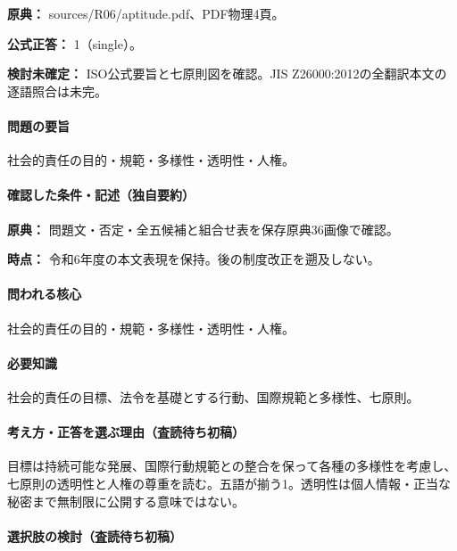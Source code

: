 \noindent\textbf{原典：} sources/R06/aptitude.pdf、PDF物理4頁。

\textbf{公式正答：} 1（single）。

\par\textbf{検討未確定：} ISO公式要旨と七原則図を確認。JIS Z26000:2012の全翻訳本文の逐語照合は未完。

\paragraph{問題の要旨} 社会的責任の目的・規範・多様性・透明性・人権。

\paragraph{確認した条件・記述（独自要約）}\mbox{}\par

\noindent\textbf{原典：} 問題文・否定・全五候補と組合せ表を保存原典36画像で確認。\par

\noindent\textbf{時点：} 令和6年度の本文表現を保持。後の制度改正を遡及しない。\par

\paragraph{問われる核心} 社会的責任の目的・規範・多様性・透明性・人権。

\paragraph{必要知識} 社会的責任の目標、法令を基礎とする行動、国際規範と多様性、七原則。

\paragraph{考え方・正答を選ぶ理由（査読待ち初稿）} 目標は持続可能な発展、国際行動規範との整合を保って各種の多様性を考慮し、七原則の透明性と人権の尊重を読む。五語が揃う1。透明性は個人情報・正当な秘密まで無制限に公開する意味ではない。

\paragraph{選択肢の検討（査読待ち初稿）}\mbox{}\par

